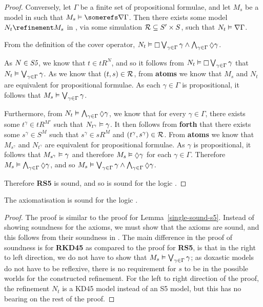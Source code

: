 \begin{proof}
Conversely, let $\Gamma$ be a finite set of propositional formulae, and let
$M_s$ be a model in \classS{} such that $M_s \entails \somerefs \covers \Gamma$.
Then there exists some model $N_t \refinement M_s$ in \classS, via some
simulation ${\cal R} \subseteq S' \times S$, such that $N_t \vDash \nabla
\Gamma$.

From the definition of the cover operator, $N_t \entails \knows
\bigvee_{\gamma \in \Gamma} \gamma \land \bigwedge_{\gamma \in \Gamma} \suspects
\gamma$. 

As $N \in \textit{S5}$, we know that $t \in tR^N$, and so it follows from
$N_t \entails \knows \bigvee_{\gamma \in \Gamma} \gamma$ that $N_t
\vDash \bigvee_{\gamma \in \Gamma} \gamma$. As we know that $(t, s) \in {\cal
R}$, from {\bf atoms} we know that $M_s$ and $N_t$ are equivalent for
propositional formulae. As each $\gamma \in \Gamma$ is propositional, it follows
that $M_s \vDash \bigvee_{\gamma \in \Gamma} \gamma$.

Furthermore, from $N_t \entails \bigwedge_{\gamma \in \Gamma} \suspects
\gamma$, we know that for every $\gamma \in \Gamma$, there exists some
$t^\gamma \in tR^{M'}$ such that $N_{t^\gamma} \vDash \gamma$. It then
follows from {\bf forth} that there exists some $s^\gamma \in S^M$ such that
$s^\gamma \in sR^M$ and $(t^\gamma, s^\gamma) \in {\cal R}$. From {\bf atoms}
we know that $M_{s^\gamma}$ and $N_{t^\gamma}$ are equivalent for
propositional formulae. As $\gamma$ is propositional, it follows that
$M_{s^\gamma} \vDash \gamma$ and therefore $M_s \entails \suspects \gamma$ for
each $\gamma \in \Gamma$.  Therefore $M_s \entails \bigwedge_{\gamma \in \Gamma}
\suspects \gamma$, and so $M_s \entails \bigvee_{\gamma \in \Gamma} \gamma \land
\bigwedge_{\gamma \in \Gamma} \suspects \gamma$.

Therefore {\bf RS5} is sound, and so \axiomSiF{} is sound for the logic
\logicSiF{}.
\end{proof}

\begin{lemma}\label{single-sound-kd45}
The axiomatisation \axiomKDiF{} is sound for the logic \logicKDiF{}.
\end{lemma}

\begin{proof}
The proof is similar to the proof for Lemma~\ref{single-sound-s5}. Instead of
showing soundness for the \axiomSi{} axioms, we must show that the \axiomKDi{}
axioms are sound, and this follows from their soundness in \logicKDi{}. The main
difference in the proof of soundness is for {\bf RKD45} as compared to the proof
for {\bf RS5}, is that in the right to left direction, we do not have to show
that $M_s \vDash \bigvee_{\gamma \in \Gamma} \gamma$; as doxastic models do
not have to be reflexive, there is no requirement for $s$ to be in the possible
worlds for the constructed refinement. For the left to right direction of the
proof, the refinement $N_t$ is a KD45 model instead of an S5 model, but this has
no bearing on the rest of the proof.
\end{proof}


